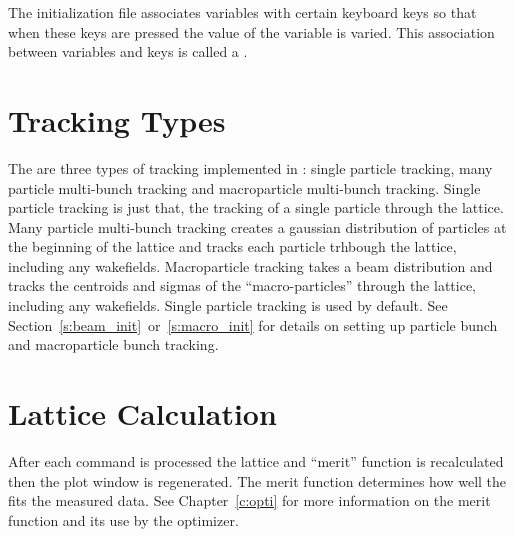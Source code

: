 The  initialization file associates variables with
certain keyboard keys so that when these keys are pressed the value of
the variable is varied. This association between variables and keys is
called a .

\section{Tracking Types}

The are three types of tracking implemented in \tao: single particle tracking,
many particle multi-bunch tracking and macroparticle multi-bunch tracking.
Single particle tracking is just that, the tracking of a single particle through
the lattice. Many particle multi-bunch tracking creates a gaussian distribution
of particles at the beginning of the lattice and tracks each particle trhbough
the lattice, including any wakefields. Macroparticle tracking takes a beam
distribution and tracks the centroids and sigmas of the ``macro-particles''
through the lattice, including any wakefields.  Single particle tracking is used
by default. See Section~\ref{s:beam_init}~or~\ref{s:macro_init} for details on
setting up particle bunch and macroparticle bunch tracking.

\section{Lattice Calculation}
\label{s:lat_calc}

After each \tao command is processed the lattice and ``merit''
function is recalculated then the plot window is regenerated. The
merit function determines how well the  fits the measured
data. See Chapter~\ref{c:opti} for more information on the merit
function and its use by the optimizer.

